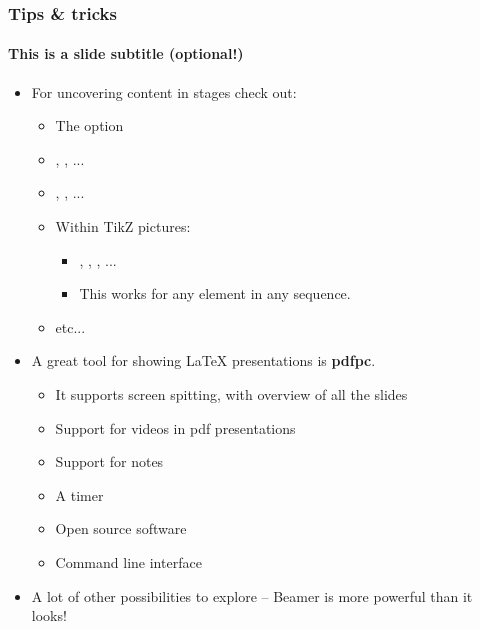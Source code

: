 \documentclass{beamer}
\begin{document}
\begin{frame}[t]
\frametitle{Tips \& tricks}
\framesubtitle{This is a slide subtitle (optional!)}

\begin{itemize}
  \item For uncovering content in stages check out:
  \begin{itemize}
    \item The  option
    \item {}, , ...
    \item {}, , ...
    \item \vspace{0.2em}Within TikZ pictures:
    \begin{itemize}
      \item {}, , , ...
      \item This works for any element in any sequence.
    \end{itemize}
    \item etc...
  \end{itemize}
  \item A great tool for showing {\LaTeX} presentations is \textbf{pdfpc}.
  \begin{itemize}
    \item It supports screen spitting, with overview of all the slides
    \item Support for videos in pdf presentations
    \item Support for notes
    \item A timer
    \item Open source software
    \item Command line interface
  \end{itemize}
  \item A lot of other possibilities to explore -- Beamer is more powerful than it looks!
\end{itemize}

\end{frame}
\end{document}
